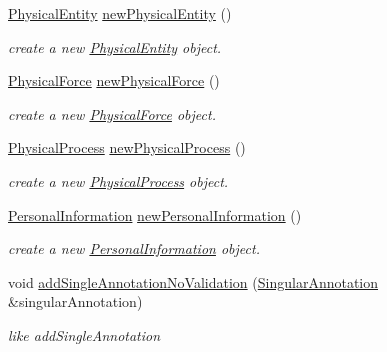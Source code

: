 \begin{DoxyCompactItemize}
\hyperlink{classomexmeta_1_1PhysicalEntity}{Physical\+Entity} \hyperlink{classomexmeta_1_1Editor_a245b2105c175892d1fddaf693fa9d636}{new\+Physical\+Entity} ()
\begin{DoxyCompactList}\small\item\em create a new \hyperlink{classomexmeta_1_1PhysicalEntity}{Physical\+Entity} object. \end{DoxyCompactList}\item 
\hyperlink{classomexmeta_1_1PhysicalForce}{Physical\+Force} \hyperlink{classomexmeta_1_1Editor_a58d21ef09f3dc5a6a66dbafe34150695}{new\+Physical\+Force} ()
\begin{DoxyCompactList}\small\item\em create a new \hyperlink{classomexmeta_1_1PhysicalForce}{Physical\+Force} object. \end{DoxyCompactList}\item 
\hyperlink{classomexmeta_1_1PhysicalProcess}{Physical\+Process} \hyperlink{classomexmeta_1_1Editor_a2815d918736ee17d07306c5cf07c8ebf}{new\+Physical\+Process} ()
\begin{DoxyCompactList}\small\item\em create a new \hyperlink{classomexmeta_1_1PhysicalProcess}{Physical\+Process} object. \end{DoxyCompactList}\item 
\hyperlink{classomexmeta_1_1PersonalInformation}{Personal\+Information} \hyperlink{classomexmeta_1_1Editor_a1943079ddbc4a4c6d896f51f360a11df}{new\+Personal\+Information} ()
\begin{DoxyCompactList}\small\item\em create a new \hyperlink{classomexmeta_1_1PersonalInformation}{Personal\+Information} object. \end{DoxyCompactList}\item 
\mbox{\label{classomexmeta_1_1Editor_a8fb3a19e8f64aeff2ac9b78c483843de}} 
void \hyperlink{classomexmeta_1_1Editor_a8fb3a19e8f64aeff2ac9b78c483843de}{add\+Single\+Annotation\+No\+Validation} (\hyperlink{classomexmeta_1_1Triple}{Singular\+Annotation} \&singular\+Annotation)
\begin{DoxyCompactList}\small\item\em like add\+Single\+Annotation \end{DoxyCompactList}\item 
\mbox{\label{classomexmeta_1_1Editor_ad05d04a31263f9c7cb8105e29fd9d158}} 

\end{DoxyCompactItemize}
